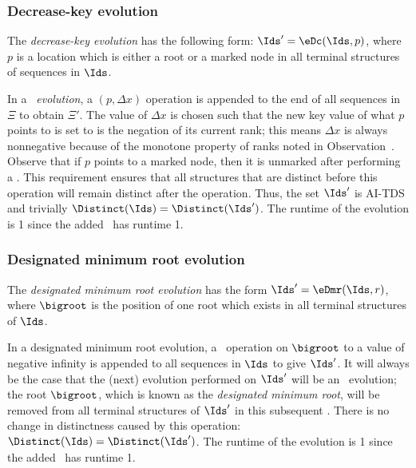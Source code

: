 \subsubsection{Decrease-key evolution} 

The \emph{decrease-key evolution} has the following form: $\Ids' = \eDc(\Ids,p)$, where $p$ is a location which is either a root or a marked node in all terminal structures of sequences in $\Ids$. 
\begin{fullonly}

\end{fullonly}
In a \emph{\opDc\ evolution}, a \opDc$(p, \Delta x)$ operation is appended to the end of all sequences in  $\Xi$ to obtain $\Xi'$. 
The value of $\Delta x$ is chosen such that the new key value of what $p$ points to is set to is the negation of its current rank; this means $\Delta x$ is always nonnegative because of the monotone property of ranks noted in Observation~. 
Observe that if $p$ points to a marked node, then it is unmarked after performing a \eDc. This requirement ensures that all structures that are distinct before this operation will remain distinct after the operation. Thus, the set $\Ids'$ is AI-TDS and trivially $\Distinct(\Ids)=\Distinct(\Ids')$. The runtime of the evolution is 1 since the added \opDc\ has runtime 1.


\subsubsection{Designated minimum root evolution} 

The \emph{designated minimum root evolution} has the form $\Ids'=\eDmr(\Ids,r)$, where $\bigroot$ is the position of one root which exists in all terminal structures of $\Ids$.
\begin{fullonly}

\end{fullonly}
In a designated minimum root evolution, a \opDc\ operation on $\bigroot$ to a value of negative infinity is appended to all sequences in $\Ids$ to give $\Ids'$. It will always be the case that the (next) evolution performed on $\Ids'$ will be an \eEm\ evolution; the root $\bigroot$, which is known as the \emph{designated minimum root}, will be removed from all terminal structures of $\Ids'$ in this subsequent \eEm. There is no change in distinctness caused by this operation: $\Distinct(\Ids)=\Distinct(\Ids')$. The runtime of the evolution is 1 since the added \opDc\ has runtime 1.



